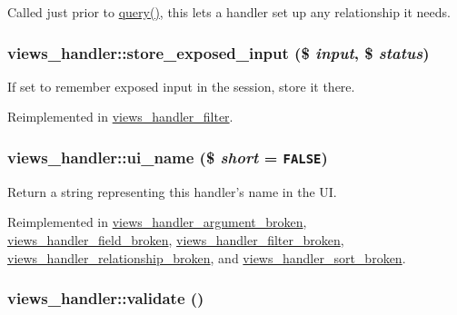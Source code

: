 Called just prior to \hyperlink{classviews__handler_91e22c95696d9fdb9ed753a10d42a21d}{query()}, this lets a handler set up any relationship it needs. \hypertarget{classviews__handler_7f2453d86d3cb3850826e8c921012f16}{
\subsubsection[{store\_\-exposed\_\-input}]{\setlength{\rightskip}{0pt plus 5cm}views\_\-handler::store\_\-exposed\_\-input (\$ {\em input}, \/  \$ {\em status})}}
\label{classviews__handler_7f2453d86d3cb3850826e8c921012f16}


If set to remember exposed input in the session, store it there. 

Reimplemented in \hyperlink{classviews__handler__filter_7ad1d1cd56293ca452be9e7d5cfd8b94}{views\_\-handler\_\-filter}.\hypertarget{classviews__handler_e81019ed08d9c3f5bca3d16c69e7b39f}{
\subsubsection[{ui\_\-name}]{\setlength{\rightskip}{0pt plus 5cm}views\_\-handler::ui\_\-name (\$ {\em short} = {\tt FALSE})}}
\label{classviews__handler_e81019ed08d9c3f5bca3d16c69e7b39f}


Return a string representing this handler's name in the UI. 

Reimplemented in \hyperlink{classviews__handler__argument__broken_c62b831ae47250571ae7449906c1687d}{views\_\-handler\_\-argument\_\-broken}, \hyperlink{classviews__handler__field__broken_0b3272926656e5fc3f6c011fa51746ed}{views\_\-handler\_\-field\_\-broken}, \hyperlink{classviews__handler__filter__broken_199df5434e076ecc6889082a83f2e266}{views\_\-handler\_\-filter\_\-broken}, \hyperlink{classviews__handler__relationship__broken_d6a2ac8a5183f5293745ce27b55ac390}{views\_\-handler\_\-relationship\_\-broken}, and \hyperlink{classviews__handler__sort__broken_d83cfcffa971a65b6e306d6fac7f6c10}{views\_\-handler\_\-sort\_\-broken}.\hypertarget{classviews__handler_323961657c7c5f3257a8fe4eeea1502f}{
\subsubsection[{validate}]{\setlength{\rightskip}{0pt plus 5cm}views\_\-handler::validate ()}}
\label{classviews__handler_323961657c7c5f3257a8fe4eeea1502f}


